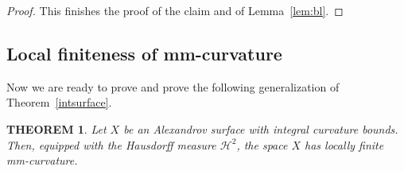\documentclass[12pt,leqno,intlimits]{amsart}
\numberwithin{equation}{section}
\newtheorem{thm}{THEOREM}[section]
\theoremstyle{definition}
\theoremstyle{remark}
\newcommand{\tref}[1]{Theorem~\ref{#1}}
\newcommand{\lref}[1]{Lemma~\ref{#1}}
\begin{document}
\begin{proof}


This finishes the proof of the claim and of \lref{lem:bl}.
\end{proof}

\subsection{Local finiteness of mm-curvature}
Now we are ready to prove and prove the following generalization of \tref{intsurface}.

\begin{thm}\label{intsurface1}
Let $X$ be an Alexandrov surface with integral curvature bounds. Then, equipped with the Hausdorff measure $\mathcal H^2$, the space $X$ has locally finite mm-curvature.
\end{thm}
%
\end{document}
